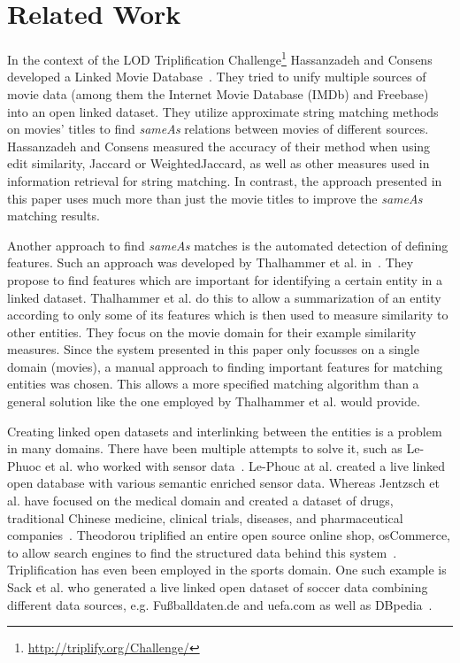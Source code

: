 \section{Related Work}
\label{sec_related_work}

In the context of the LOD Triplification Challenge\footnote{\url{http://triplify.org/Challenge/}} Hassanzadeh and Consens developed a Linked Movie Database~\cite{LMDB}.
They tried to unify multiple sources of movie data (among them the Internet Movie Database (IMDb) and Freebase) into an open linked dataset.
They utilize approximate string matching methods on movies' titles to find \textit{sameAs} relations between movies of different sources.
Hassanzadeh and Consens measured the accuracy of their method when using edit similarity, Jaccard or WeightedJaccard, as well as other measures used in information retrieval for string matching.
In contrast, the approach presented in this paper uses much more than just the movie titles to improve the \textit{sameAs} matching results.

Another approach to find \textit{sameAs} matches is the automated detection of defining features.
Such an approach was developed by Thalhammer et al. in~\cite{MovieSummarization}.
They propose to find features which are important for identifying a certain entity in a linked dataset.
Thalhammer et al. do this to allow a summarization of an entity according to only some of its features which is then used to measure similarity to other entities.
They focus on the movie domain for their example similarity measures.
Since the system presented in this paper only focusses on a single domain (movies), a manual approach to finding important features for matching entities was chosen.
This allows a more specified matching algorithm than a general solution like the one employed by Thalhammer et al. would provide.

Creating linked open datasets and interlinking between the entities is a problem in many domains.
There have been multiple attempts to solve it, such as Le-Phuoc et al. who worked with sensor data~\cite{SensorData}.
Le-Phouc at al. created a live linked open database with various semantic enriched sensor data.
Whereas Jentzsch et al. have focused on the medical domain and created a dataset of drugs, traditional Chinese medicine, clinical trials, diseases, and pharmaceutical companies~\cite{openDrugData}.
Theodorou triplified an entire open source online shop, osCommerce, to allow search engines to find the structured data behind this system~\cite{osCommerce}.
Triplification has even been employed in the sports domain.
One such example is Sack et al. who generated a live linked open dataset of soccer data combining different data sources, e.g. Fußballdaten.de and uefa.com as well as DBpedia~\cite{smm}.


